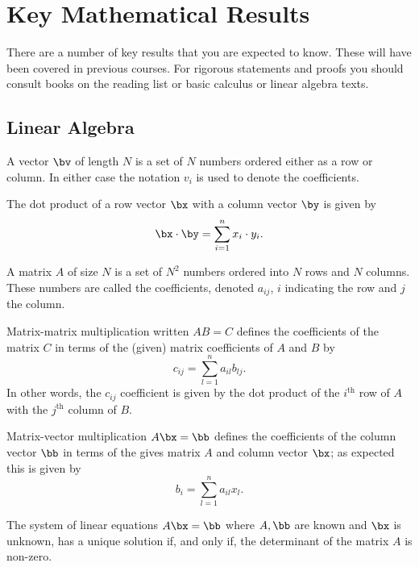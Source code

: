 
\chapter{Key Mathematical Results}

There are a number of key results that you are expected to know. These
will have been covered in previous courses. For rigorous statements
and proofs you should consult books on the reading list or basic
calculus or linear algebra texts.

\section{Linear Algebra}

A vector $\bv$ of length $N$ is a set of $N$ numbers ordered either as
a row or column. In either case the notation $v_i$ is used to denote
the coefficients.

The dot product of a row vector $\bx$ with a column vector $\by$ is
given by
%
\begin{equation}
  \label{eq:key_la1}
  \bx \cdot \by = \sum_{i=1}^n x_i \cdot y_i.
\end{equation}

A matrix $A$ of size $N$ is a set of $N^2$ numbers ordered into $N$
rows and $N$ columns. These numbers are called the coefficients,
denoted $a_{ij}$, $i$ indicating the row and $j$ the column.

Matrix-matrix multiplication written $A B = C$ defines the
coefficients of the matrix $C$ in terms of the (given) matrix
coefficients of $A$ and $B$ by
%
\begin{equation}
  \label{eq:key_la2}
  c_{ij} = \sum_{l = 1}^n a_{i l} b_{l j}.
\end{equation}
%
In other words, the $c_{ij}$ coefficient is given by the dot product
of the $i^{\text{th}}$ row of $A$ with the $j^{\text{th}}$ column of
$B$.

Matrix-vector multiplication $A \bx = \bb$ defines the coefficients of
the column vector $\bb$ in terms of the gives matrix $A$ and column
vector $\bx$; as expected this is given by
%
\begin{equation}
  \label{eq:key_la3}
  b_{i} = \sum_{l = 1}^n a_{i l} x_{l}.
\end{equation}

The system of linear equations $A \bx = \bb$ where $A, \bb$ are known
and $\bx$ is unknown, has a unique solution if, and only if, the
determinant of the matrix $A$ is non-zero.

